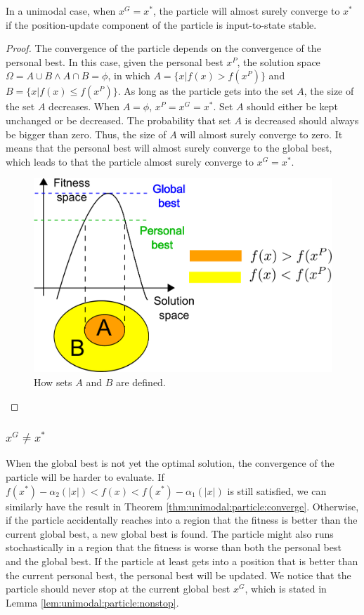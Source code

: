 \begin{mythm}
\label{thm:unimodal:particle:converge}
In a unimodal case, when $ x^{G} = x^{*} $, the particle will almost surely converge to $ x^{*} $ if the position-update component of the particle is input-to-state stable.
\begin{proof}
The convergence of the particle depends on the convergence of the personal best.
In this case, given the personal best $ x^{P} $, the solution space $ \Omega = A \cup B \land A \cap B = \phi $, in which 
$ A = \{ x | f(x) > f(x^{P}) \} $ and $ B = \{ x | f(x) \leq f(x^{P}) \} $.
As long as the particle gets into the set $ A $, the size of the set $ A $ decreases.
When $ A = \phi $, $ x^{P} = x^{G} = x^{*} $.
Set $ A $ should either be kept unchanged or be decreased.
The probability that set $ A $ is decreased should always be bigger than zero.
Thus, the size of $ A $ will almost surely converge to zero.
It means that the personal best will almost surely converge to the global best, which leads to that the particle almost surely converge to $ x^{G}  = x^{*} $.

\begin{figure}[tbph]
\centering
\includegraphics[width=0.7
\linewidth]{./fig/two_sets_split}
\caption{How sets $ A $ and $ B $ are defined.}
\label{fig:two_sets_split}
\end{figure}

\end{proof}
\end{mythm}

\subsubsection{ $ x^{G} \not = x^{*}  $ }

When the global best is not yet the optimal solution, the convergence of the particle will be harder to evaluate.
If  $ f(x^{*}) - \alpha_{2} ( |x| ) <  f(x) < f(x^{*}) - \alpha_{1} ( |x| ) $ is still satisfied, we can similarly have the result in Theorem \ref{thm:unimodal:particle:converge}.
Otherwise, if the particle accidentally reaches into a region that the fitness is better than the current global best, a new global best is found.
The particle might also runs stochastically in a region that the fitness is worse than both the personal best and the global best.
If the particle at least gets into a position that is better than the current personal best, the personal best will be updated. 
We notice that the particle should never stop at the current global best $ x^{G} $, which is stated in Lemma \ref{lem:unimodal:particle:nonstop}.

